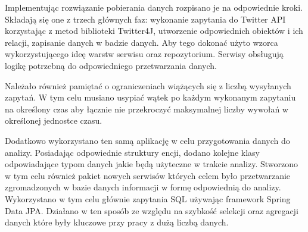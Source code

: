 \par
\par
Implementując rozwiązanie pobierania danych rozpisano je na odpowiednie kroki. Składają się one z trzech głównych faz: wykonanie zapytania do Twitter API korzystając z metod biblioteki Twitter4J, utworzenie odpowiednich obiektów i ich relacji, zapisanie danych w badzie danych. Aby tego dokonać użyto wzorca wykorzystującego ideę warstw serwisu oraz repozytorium. Serwisy obsługują logikę potrzebną do odpowiedniego przetwarzania danych. 

\par
Należało również pamiętać o ograniczeniach wiążących się z liczbą wysyłanych zapytań. W tym celu musiano usypiać wątek po każdym wykonanym zapytaniu na określony czas aby łącznie nie przekroczyć maksymalnej liczby wywołań w określonej jednostce czasu. 

\par
Dodatkowo wykorzystano ten samą aplikację w celu przygotowania danych do analizy. Posiadając odpowiednie struktury encji, dodano kolejne klasy odpowiadające typom danych jakie będą użyteczne w trakcie analizy. Stworzono w tym celu również pakiet nowych serwisów których celem było przetwarzanie zgromadzonych w bazie danych informacji w formę odpowiednią do analizy. Wykorzystano w tym celu głównie zapytania SQL używając framework Spring Data JPA. Działano w ten sposób ze względu na szybkość selekcji oraz agregacji danych które były kluczowe przy pracy z dużą liczbą danych. 

\par


